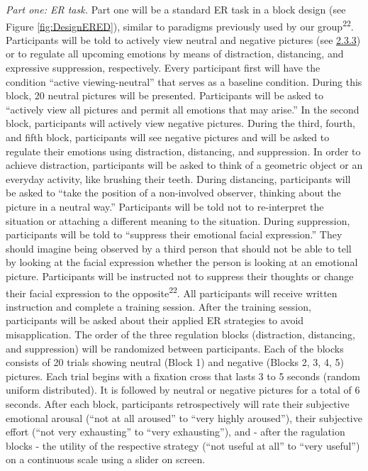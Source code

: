 \documentclass[
  english,
  man,floatsintext]{apa6}
\begin{document}
\emph{Part one: ER task.} Part one will be a standard ER task in a block design (see Figure \ref{fig:DesignERED}), similar to paradigms previously used by our group\textsuperscript{22}.
Participants will be told to actively view neutral and negative pictures (see \protect\hyperlink{ux5cux23stimuli}{2.3.3}) or to regulate all upcoming emotions by means of distraction, distancing, and expressive suppression, respectively.
Every participant first will have the condition ``active viewing-neutral'' that serves as a baseline condition.
During this block, 20 neutral pictures will be presented.
Participants will be asked to ``actively view all pictures and permit all emotions that may arise.''
In the second block, participants will actively view negative pictures.
During the third, fourth, and fifth block, participants will see negative pictures and will be asked to regulate their emotions using distraction, distancing, and suppression.
In order to achieve distraction, participants will be asked to think of a geometric object or an everyday activity, like brushing their teeth.
During distancing, participants will be asked to ``take the position of a non-involved observer, thinking about the picture in a neutral way.''
Participants will be told not to re-interpret the situation or attaching a different meaning to the situation.
During suppression, participants will be told to ``suppress their emotional facial expression.''
They should imagine being observed by a third person that should not be able to tell by looking at the facial expression whether the person is looking at an emotional picture.
Participants will be instructed not to suppress their thoughts or change their facial expression to the opposite\textsuperscript{22}.
All participants will receive written instruction and complete a training session.
After the training session, participants will be asked about their applied ER strategies to avoid misapplication.
The order of the three regulation blocks (distraction, distancing, and suppression) will be randomized between participants.
Each of the blocks consists of 20 trials showing neutral (Block 1) and negative (Blocks 2, 3, 4, 5) pictures.
Each trial begins with a fixation cross that lasts 3 to 5 seconds (random uniform distributed).
It is followed by neutral or negative pictures for a total of 6 seconds.
After each block, participants retrospectively will rate their subjective emotional arousal (``not at all aroused'' to ``very highly aroused''), their subjective effort (``not very exhausting'' to ``very exhausting''), and - after the ragulation blocks - the utility of the respective strategy (``not useful at all'' to ``very useful'') on a continuous scale using a slider on screen.
\end{document}
